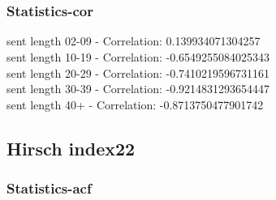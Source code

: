 \documentclass{article}%
\begin{document}
\begin{figure}[ht]%
\centering%
\setlength{\abovecaptionskip}{-35pt}%
%
%
\\%
%
%
\\%
%
\end{figure}

%
\newpage%
\subsubsection{Statistics{-}cor}%
\label{ssubsec:Statistics{-}cor}%
\noindent%
sent length 02-09 - Correlation: 0.139934071304257\\%
sent length 10-19 - Correlation: -0.6549255084025343\\%
sent length 20-29 - Correlation: -0.7410219596731161\\%
sent length 30-39 - Correlation: -0.9214831293654447\\%
sent length 40+ - Correlation: -0.8713750477901742\\

%
\newpage

%
\subsection{Hirsch index22}%
\label{subsec:Hirschindex22}%
\subsubsection{Statistics{-}acf}%
\label{ssubsec:Statistics{-}acf}%
\end{document}
